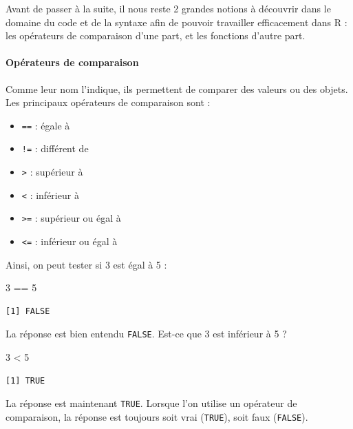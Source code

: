 \documentclass[a4paperpaper,]{article}
\newenvironment{Shaded}{\begin{snugshade}}{\end{snugshade}}
\newcommand{\DecValTok}[1]{\textcolor[rgb]{0.69,0.50,0.00}{#1}}
\newcommand{\OperatorTok}[1]{\textcolor[rgb]{0.12,0.11,0.11}{#1}}
\newcommand{\StringTok}[1]{\textcolor[rgb]{0.75,0.01,0.01}{#1}}
\providecommand{\tightlist}{%
  \setlength{\itemsep}{0pt}\setlength{\parskip}{0pt}}
\let\oldparagraph\paragraph
\renewcommand{\paragraph}[1]{\oldparagraph{#1}\mbox{}}
\theoremstyle{definition}
\theoremstyle{definition}
\theoremstyle{definition}
\theoremstyle{remark}
\begin{document}
Avant de passer à la suite, il nous reste 2 grandes notions à découvrir
dans le domaine du code et de la syntaxe afin de pouvoir travailler
efficacement dans R : les opérateurs de comparaison d'une part, et les
fonctions d'autre part.

\hypertarget{comparaison}{%
\paragraph{Opérateurs de comparaison}\label{comparaison}}

Comme leur nom l'indique, ils permettent de comparer des valeurs ou des
objets. Les principaux opérateurs de comparaison sont :

\begin{itemize}
\tightlist
\item
  \texttt{==} : égale à
\item
  \texttt{!=} : différent de
\item
  \texttt{\textgreater{}} : supérieur à
\item
  \texttt{\textless{}} : inférieur à
\item
  \texttt{\textgreater{}=} : supérieur ou égal à
\item
  \texttt{\textless{}=} : inférieur ou égal à
\end{itemize}

Ainsi, on peut tester si 3 est égal à 5 :

\begin{Shaded}
\begin{Highlighting}[]
\DecValTok{3} \OperatorTok{==}\StringTok{ }\DecValTok{5}
\end{Highlighting}
\end{Shaded}

\begin{verbatim}
[1] FALSE
\end{verbatim}

La réponse est bien entendu \texttt{FALSE}. Est-ce que 3 est inférieur à
5 ?

\begin{Shaded}
\begin{Highlighting}[]
\DecValTok{3} \OperatorTok{<}\StringTok{ }\DecValTok{5}
\end{Highlighting}
\end{Shaded}

\begin{verbatim}
[1] TRUE
\end{verbatim}

La réponse est maintenant \texttt{TRUE}. Lorsque l'on utilise un
opérateur de comparaison, la réponse est toujours soit vrai
(\texttt{TRUE}), soit faux (\texttt{FALSE}).
\end{document}
